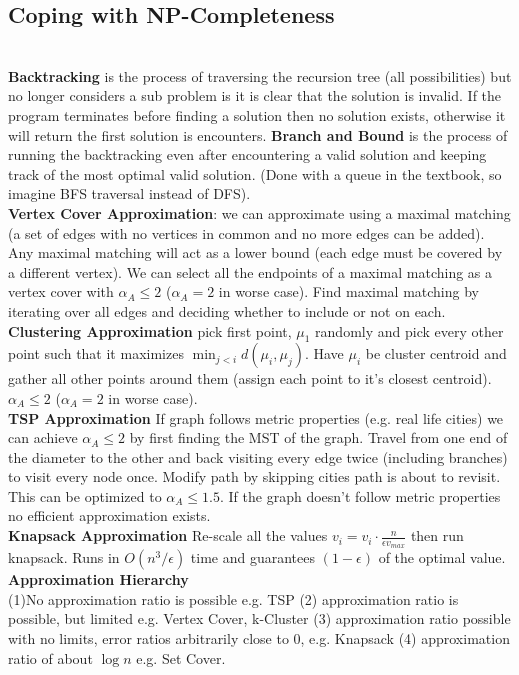 \documentclass{article}
\begin{document}
\begin{multicols}{2}
\section*{Coping with NP-Completeness}\\
\textbf{Backtracking} is the process of traversing the recursion tree (all possibilities) but no longer considers a sub problem is it is clear that the solution is invalid. If the program terminates before finding a solution then no solution exists, otherwise it will return the first solution is encounters. \textbf{Branch and Bound} is the process of running the backtracking even after encountering a valid solution and keeping track of the most optimal valid solution. (Done with a queue in the textbook, so imagine BFS traversal instead of DFS).\\
\textbf{Vertex Cover Approximation}: we can approximate using a maximal matching (a set of edges with no vertices in common and no more edges can be added). Any maximal matching will act as a lower bound (each edge must be covered by a different vertex). We can select all the endpoints of a maximal matching as a vertex cover with $\alpha_{A} \leq 2$ ($\alpha_{A}= 2$ in worse case). Find maximal matching by iterating over all edges and deciding whether to include or not on each.\\
\textbf{Clustering Approximation} pick first point, $\mu_1$ randomly and pick every other point such that it maximizes $\min_{j < i}d(\mu_i, \mu_j)$. Have $\mu_i$ be cluster centroid and gather all other points around them (assign each point to it's closest centroid). $\alpha_{A} \leq 2$ ($\alpha_{A}= 2$ in worse case). \\
\textbf{TSP Approximation} If graph follows metric properties (e.g. real life cities) we can achieve $\alpha_{A} \leq 2$ by first finding the MST of the graph. Travel from one end of the diameter to the other and back visiting every edge twice (including branches) to visit every node once. Modify path by skipping cities path is about to revisit. This can be optimized to $\alpha_{A} \leq 1.5$. If the graph doesn't follow metric properties no efficient approximation exists.  \\
\textbf{Knapsack Approximation} Re-scale all the values $v_i = v_i \cdot \frac{n}{\epsilon v_{max}}$ then run knapsack. Runs in $O(n^3/\epsilon)$ time and guarantees $(1 - \epsilon)$ of the optimal value.\\
\textbf{Approximation Hierarchy} \\ 
(1)No approximation ratio is possible e.g. TSP (2) approximation ratio is possible, but limited e.g. Vertex Cover, k-Cluster (3) approximation ratio possible with no limits, error ratios arbitrarily close to 0, e.g. Knapsack (4) approximation ratio of about $\log n$ e.g. Set Cover. \\

\end{multicols} 
\end{document}
